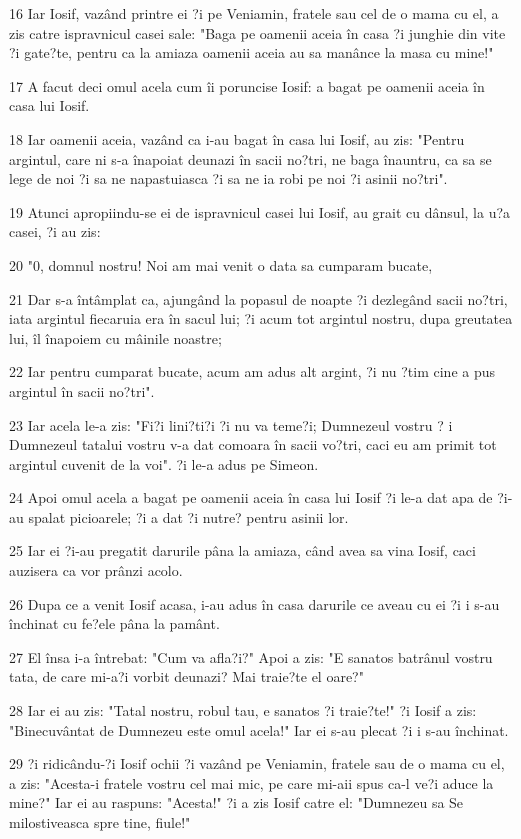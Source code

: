 \par 16 Iar Iosif, vazând printre ei ?i pe Veniamin, fratele sau cel de o mama cu el, a zis catre ispravnicul casei sale: "Baga pe oamenii aceia în casa ?i junghie din vite ?i gate?te, pentru ca la amiaza oamenii aceia au sa manânce la masa cu mine!"
\par 17 A facut deci omul acela cum îi poruncise Iosif: a bagat pe oamenii aceia în casa lui Iosif.
\par 18 Iar oamenii aceia, vazând ca i-au bagat în casa lui Iosif, au zis: "Pentru argintul, care ni s-a înapoiat deunazi în sacii no?tri, ne baga înauntru, ca sa se lege de noi ?i sa ne napastuiasca ?i sa ne ia robi pe noi ?i asinii no?tri".
\par 19 Atunci apropiindu-se ei de ispravnicul casei lui Iosif, au grait cu dânsul, la u?a casei, ?i au zis:
\par 20 "0, domnul nostru! Noi am mai venit o data sa cumparam bucate,
\par 21 Dar s-a întâmplat ca, ajungând la popasul de noapte ?i dezlegând sacii no?tri, iata argintul fiecaruia era în sacul lui; ?i acum tot argintul nostru, dupa greutatea lui, îl înapoiem cu mâinile noastre;
\par 22 Iar pentru cumparat bucate, acum am adus alt argint, ?i nu ?tim cine a pus argintul în sacii no?tri".
\par 23 Iar acela le-a zis: "Fi?i lini?ti?i ?i nu va teme?i; Dumnezeul vostru ? i Dumnezeul tatalui vostru v-a dat comoara în sacii vo?tri, caci eu am primit tot argintul cuvenit de la voi". ?i le-a adus pe Simeon.
\par 24 Apoi omul acela a bagat pe oamenii aceia în casa lui Iosif ?i le-a dat apa de ?i-au spalat picioarele; ?i a dat ?i nutre? pentru asinii lor.
\par 25 Iar ei ?i-au pregatit darurile pâna la amiaza, când avea sa vina Iosif, caci auzisera ca vor prânzi acolo.
\par 26 Dupa ce a venit Iosif acasa, i-au adus în casa darurile ce aveau cu ei ?i i s-au închinat cu fe?ele pâna la pamânt.
\par 27 El însa i-a întrebat: "Cum va afla?i?" Apoi a zis: "E sanatos batrânul vostru tata, de care mi-a?i vorbit deunazi? Mai traie?te el oare?"
\par 28 Iar ei au zis: "Tatal nostru, robul tau, e sanatos ?i traie?te!" ?i Iosif a zis: "Binecuvântat de Dumnezeu este omul acela!" Iar ei s-au plecat ?i i s-au închinat.
\par 29 ?i ridicându-?i Iosif ochii ?i vazând pe Veniamin, fratele sau de o mama cu el, a zis: "Acesta-i fratele vostru cel mai mic, pe care mi-aii spus ca-l ve?i aduce la mine?" Iar ei au raspuns: "Acesta!" ?i a zis Iosif catre el: "Dumnezeu sa Se milostiveasca spre tine, fiule!"

